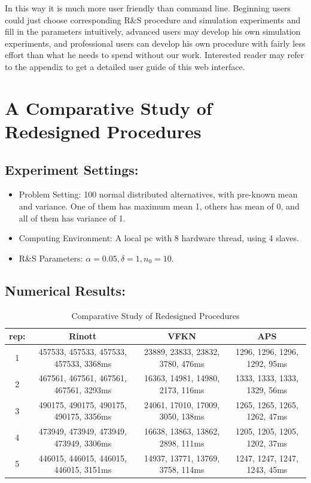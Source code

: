 In this way it is much more user friendly than command line. Beginning users could just choose corresponding R\&S procedure and simulation experiments and fill in the parameters intuitively, advanced users may develop his own simulation experiments, and professional users can develop his own procedure with fairly less effort than what he needs to spend without our work. Interested reader may refer to the appendix to get a detailed user guide of this web interface.

\section{A Comparative Study of Redesigned Procedures}

\subsection{Experiment Settings:}

\begin{itemize}
\item {Problem Setting: } 100 normal distributed alternatives, with pre-known mean and variance. One of them has maximum mean 1, others has mean of 0, and all of them has variance of 1.
\item {Computing Environment: } A local pc with 8 hardware thread, using 4 slaves.
\item {R\&S Parameters: } $\alpha=0.05, \delta=1, n_0 = 10$.
\end{itemize}

\subsection{Numerical Results:}

\begin{table}[ht]
\begin{center}
\scalebox{0.75}
{
\begin{tabular}{|c|c|c|c|}
\hline
rep: & Rinott & VFKN & APS \\
\hline
1 & 457533, 457533, 457533, 457533, 3368ms & 23889, 23833, 23832, 3780, 476ms & 1296, 1296, 1296, 1292, 95ms \\
\hline
2 & 467561, 467561, 467561, 467561, 3293ms & 16363, 14981, 14980, 2173, 116ms & 1333, 1333, 1333, 1329, 56ms \\
\hline
3 & 490175, 490175, 490175, 490175, 3356ms & 24061, 17010, 17009, 3050, 138ms & 1265, 1265, 1265, 1262, 47ms \\
\hline
4 & 473949, 473949, 473949, 473949, 3306ms & 16638, 13863, 13862, 2898, 111ms & 1205, 1205, 1205, 1202, 37ms \\
\hline
5 & 446015, 446015, 446015, 446015, 3151ms & 14937, 13771, 13769, 3758, 114ms & 1247, 1247, 1247, 1243, 45ms \\
\hline
\end{tabular}
}
\end{center}
\caption{Comparative Study of Redesigned Procedures}
\end{table}

